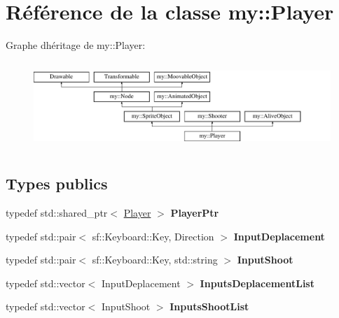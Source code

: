 \hypertarget{classmy_1_1Player}{}\section{Référence de la classe my\+:\+:Player}
\label{classmy_1_1Player}
Graphe d\textquotesingle{}héritage de my\+:\+:Player\+:\begin{figure}[H]
\begin{center}
\leavevmode
\includegraphics[height=3.318518cm]{classmy_1_1Player}
\end{center}
\end{figure}
\subsection*{Types publics}
\begin{DoxyCompactItemize}
\item 
\mbox{\label{classmy_1_1Player_a91ad09d3d6b0e72ad589e7b95f521497}} 
typedef std\+::shared\+\_\+ptr$<$ \hyperlink{classmy_1_1Player}{Player} $>$ {\bfseries Player\+Ptr}
\item 
\mbox{\label{classmy_1_1Player_a4f73979cf1696c825c30744d8c0c4dcc}} 
typedef std\+::pair$<$ sf\+::\+Keyboard\+::\+Key, Direction $>$ {\bfseries Input\+Deplacement}
\item 
\mbox{\label{classmy_1_1Player_a5f7aa685cb5a2660de108f52d44909d5}} 
typedef std\+::pair$<$ sf\+::\+Keyboard\+::\+Key, std\+::string $>$ {\bfseries Input\+Shoot}
\item 
\mbox{\label{classmy_1_1Player_a429264ee8d5e72d162ad2b487117cd30}} 
typedef std\+::vector$<$ Input\+Deplacement $>$ {\bfseries Inputs\+Deplacement\+List}
\item 
\mbox{\label{classmy_1_1Player_a01cba57770a69e897411dba348b9157a}} 
typedef std\+::vector$<$ Input\+Shoot $>$ {\bfseries Inputs\+Shoot\+List}
\end{DoxyCompactItemize}
